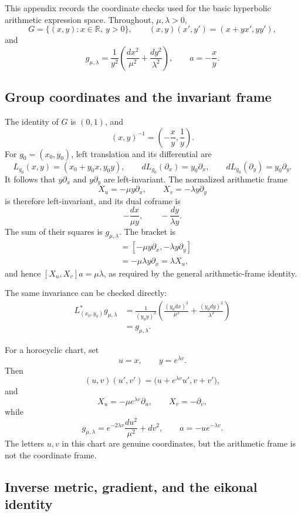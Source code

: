This appendix records the coordinate checks used for the basic hyperbolic
arithmetic expression space.  Throughout, \(\mu,\lambda>0\),
\[
 G=\{(x,y):x\in\mathbb R,\ y>0\},
 \qquad
 (x,y)(x',y')=(x+yx',yy'),
\]
and
\[
 g_{\mu,\lambda}
 =\frac1{y^2}
  \left(\frac{dx^2}{\mu^2}+\frac{dy^2}{\lambda^2}\right),
 \qquad
 a=-\frac xy.
\]

\subsection{Group coordinates and the invariant frame}

The identity of \(G\) is \((0,1)\), and
\[
 (x,y)^{-1}=\left(-\frac xy,\frac1y\right).
\]
For \(g_0=(x_0,y_0)\), left translation and its differential are
\[
 L_{g_0}(x,y)=(x_0+y_0x,y_0y),
 \qquad
 dL_{g_0}(\partial_x)=y_0\partial_x,
 \qquad
 dL_{g_0}(\partial_y)=y_0\partial_y.
\]
It follows that \(y\partial_x\) and \(y\partial_y\) are left-invariant.
The normalized arithmetic frame
\[
 X_u=-\mu y\partial_x,
 \qquad
 X_v=-\lambda y\partial_y
\]
is therefore left-invariant, and its dual coframe is
\[
 -\frac{dx}{\mu y},
 \qquad
 -\frac{dy}{\lambda y}.
\]
The sum of their squares is \(g_{\mu,\lambda}\).  The bracket is
\begin{align*}
 [X_u,X_v]
 &=[-\mu y\partial_x,-\lambda y\partial_y]\\
 &=-\mu\lambda y\partial_x
 =\lambda X_u,
\end{align*}
and hence \([X_u,X_v]a=\mu\lambda\), as required by the general
arithmetic-frame identity.

The same invariance can be checked directly:
\begin{align*}
 L_{(x_0,y_0)}^*g_{\mu,\lambda}
 &=
 \frac1{(y_0y)^2}
 \left(
  \frac{(y_0dx)^2}{\mu^2}
  +\frac{(y_0dy)^2}{\lambda^2}
 \right)\\
 &=g_{\mu,\lambda}.
\end{align*}

For a horocyclic chart, set
\[
 u=x,\qquad y=e^{\lambda v}.
\]
Then
\[
 (u,v)(u',v')
 =\bigl(u+e^{\lambda v}u',v+v'\bigr),
\]
and
\[
 X_u=-\mu e^{\lambda v}\partial_u,
 \qquad
 X_v=-\partial_v,
\]
while
\[
 g_{\mu,\lambda}
 =e^{-2\lambda v}\frac{du^2}{\mu^2}+dv^2,
 \qquad
 a=-u e^{-\lambda v}.
\]
The letters \(u,v\) in this chart are genuine coordinates, but the arithmetic
frame is not the coordinate frame.

\subsection{Inverse metric, gradient, and the eikonal identity}

